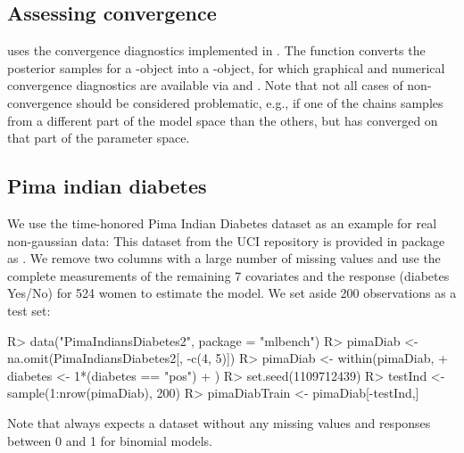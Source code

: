 \documentclass[article, shortnames, nojss, noheadings, notitle]{jss}
\begin{document}
\subsection{Assessing convergence}\label{convergence}
\sloppy
{} uses the convergence diagnostics implemented in  \citep{R2WinBUGS}.
The function  converts the posterior samples for a -object into a -object, for which graphical and numerical convergence diagnostics
are available via  and . Note that not all cases of non-convergence should be considered problematic, e.g., if one of the
chains samples from a different part of the model space than the others, but has converged on that part of the parameter space.
\fussy


\subsection{Pima indian diabetes}\label{pima}
We use the time-honored Pima Indian Diabetes dataset as an example for real non-gaussian data:
This dataset from the UCI repository \citep{uci} is provided in package  \citep{mlbench} as .
We remove two columns with a large number of missing values and
use the complete measurements of the remaining 7 covariates and the response (diabetes Yes/No) for 524 women
to estimate the model.
We set aside 200 observations as a test set:
\begin{Schunk}
\begin{Sinput}
R> data("PimaIndiansDiabetes2", package = "mlbench")
R> pimaDiab <- na.omit(PimaIndiansDiabetes2[, -c(4, 5)])
R> pimaDiab <- within(pimaDiab,{
+              diabetes <- 1*(diabetes == "pos")
+          })
R> set.seed(1109712439)
R> testInd <- sample(1:nrow(pimaDiab), 200)
R> pimaDiabTrain <- pimaDiab[-testInd,]
\end{Sinput}
\end{Schunk}
Note that  always expects a dataset without any missing values and responses between 0 and 1 for binomial models.
\end{document}
